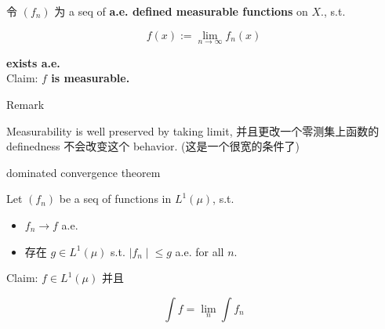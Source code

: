 \documentclass{qlnotes-export}
\begin{document}
\begin{lemma}\label{lem-05-integration-of-real-and-complex-functions-lemma-002}

令 \((f_{n})\) 为 a seq of \textbf{a.e. defined measurable functions} on \(X\)., s.t.

\[f(x) := \lim\limits_{n\rightarrow\infty}f_{n}(x)\]

\textbf{exists a.e.}\\
Claim: \textbf{\(f\) is measurable.}

\end{lemma}

\begin{qlremark}{Remark}

Measurability is well preserved by taking limit, 并且更改一个零测集上函数的 definedness 不会改变这个 behavior. (这是一个很宽的条件了)

\end{qlremark}

\begin{theorem}{dominated convergence theorem}\label{thm-05-integration-of-real-and-complex-functions-dominated-convergence-theorem}

Let \((f_{n})\) be a seq of functions in \(L^{1}(\mu)\), s.t.

\begin{itemize}
\item
  \(f_{n}\rightarrow f\) a.e.
\item
  存在 \(g \in L^{1}(\mu)\) s.t. \(\left. |f_{n} \middle| \leq g \right.\) a.e. for all \(n\).
\end{itemize}

Claim: \(f \in L^{1}(\mu)\) 并且

\[\int f = \lim\limits_{n}\int f_{n}\]

\end{theorem}
\end{document}
